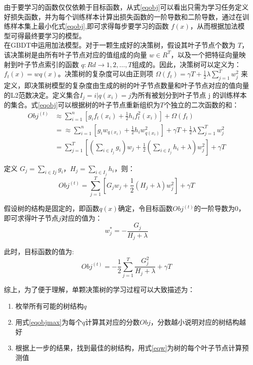 \documentclass[a4paper]{article}
\begin{document}
由于要学习的函数仅仅依赖于目标函数，从式\ref{eqobj}可以看出只需为学习任务定义好损失函数，并为每个训练样本计算出损失函数的一阶导数和二阶导数，通过在训练样本集上最小化式\ref{eqobj},即可求得每步要学习的函数 $f(x)$，从而根据加法模型可得最终要学习的模型。\\

在GBDT中运用加法模型。对于一颗生成好的决策树，假设其叶子节点个数为 $T$，该决策树是由所有叶子节点对应的值组成的向量 $w\in R^T$，以及一个把特征向量映射到叶子节点索引的函数 $q:Rd→1,2,\ldots,T$组成的。因此，决策树可以定义为：$f_t(x)=w{q(x)}$。决策树的复杂度可以由正则项 $\Omega(f_t)=\gamma T + \frac{1}{2}\lambda \sum_{j=1}^T w_j^2$ 来定义，即决策树模型的复杂度由生成的树的叶子节点数量和叶子节点对应的值向量的L2范数决定。定义集合$I_j=i|q(x_i)=j$为所有被划分到叶子节点 j 的训练样本的集合。式\ref{eqobj}可以根据树的叶子节点重新组织为$ T $个独立的二次函数的和：
\begin{align}
Obj^{(t)}&\approx \sum_{i=1}^{n} \left[g_i f_t(x_i)+\frac{1}{2}h_i f^2_t(x_i)\right]+\Omega(f_t)\\
&=\approx \sum_{i=1}^{n} \left[g_i w_{q(x_i)}+\frac{1}{2}h_i w^2_{q(x_i)}\right]+\gamma T + \frac{1}{2} \lambda \sum_{j=1}^T w_j^2\\
&=\sum_{j=1}^T \left[ (\sum_{i \in I_j} g_i)w_j+\frac{1}{2}(\sum_{i \in I_j} h_i+\lambda)w_j^2 \right]+\gamma T
\end{align}

定义 $G_j=\sum_{i \in Ij}g_i$，$H_j=\sum_{i \in I_j}h_i$，则：
\begin{equation}
Obj^{(t)}=\sum_{j=1}^T \left[ G_j w_j+\frac{1}{2}(H_j+\lambda)w_j^2 \right]+\gamma T
\end{equation}

假设树的结构是固定的，即函数$q(x)$确定，令目标函数$Obj^{(t)}$的一阶导数为0，即可求得叶子节点$j$对应的值为：
\begin{equation}\label{eqw}
w_j^\ast=-\frac{G_j}{H_j+\lambda}
\end{equation}

此时，目标函数的值为:
\begin{equation}\label{eqobjmax}
Obj^{(t)}=-\frac{1}{2}\sum_{j=1}^{T}\frac{G_j^2}{H_j+\lambda}+\gamma T
\end{equation}

综上，为了便于理解，单颗决策树的学习过程可以大致描述为：
\begin{enumerate}
\item 枚举所有可能的树结构$q$
\item 用式\ref{eqobjmax}为每个$q$计算其对应的分数$Obj$，分数越小说明对应的树结构越好
\item 根据上一步的结果，找到最佳的树结构，用式\ref{eqw}为树的每个叶子节点计算预测值
\end{enumerate}
\end{document}
